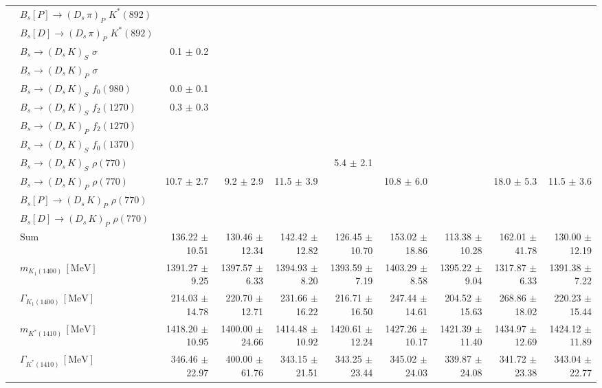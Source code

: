 \begin{tabular}{l l  r  r  r  r  r  r  r  r  }
 & $B_s[P] \to ( D_s \, \pi)_{P} \, \, K^{*}(892)$ &  &  &  &  &  &  &  &  \\ 
 & $B_s[D] \to ( D_s \, \pi)_{P} \, \, K^{*}(892)$ &  &  &  &  &  &  &  &  \\ 
 & $B_s \to ( D_s \, K)_{S} \, \, \sigma$ & 0.1 $\pm$ 0.2 &  &  &  &  &  &  &  \\ 
 & $B_s \to ( D_s \, K)_{P} \, \, \sigma$ &  &  &  &  &  &  &  &  \\ 
 & $B_s \to ( D_s \, K)_{S} \, \, f_0(980)$ & 0.0 $\pm$ 0.1 &  &  &  &  &  &  &  \\ 
 & $B_s \to ( D_s \, K)_{S} \, \, f_2(1270)$ & 0.3 $\pm$ 0.3 &  &  &  &  &  &  &  \\ 
 & $B_s \to ( D_s \, K)_{P} \, \, f_2(1270)$ &  &  &  &  &  &  &  &  \\ 
 & $B_s \to ( D_s \, K)_{S} \, \, f_0(1370)$ &  &  &  &  &  &  &  &  \\ 
 & $B_s \to ( D_s \, K)_{S} \, \, \rho(770)$ &  &  &  & 5.4 $\pm$ 2.1 &  &  &  &  \\ 
 & $B_s \to ( D_s \, K)_{P} \, \, \rho(770)$ & 10.7 $\pm$ 2.7 & 9.2 $\pm$ 2.9 & 11.5 $\pm$ 3.9 &  & 10.8 $\pm$ 6.0 &  & 18.0 $\pm$ 5.3 & 11.5 $\pm$ 3.6 \\ 
 & $B_s[P] \to ( D_s \, K)_{P} \, \, \rho(770)$ &  &  &  &  &  &  &  &  \\ 
 & $B_s[D] \to ( D_s \, K)_{P} \, \, \rho(770)$ &  &  &  &  &  &  &  &  \\ 
 & $\text{Sum}$ & 136.22 $\pm$ 10.51 & 130.46 $\pm$ 12.34 & 142.42 $\pm$ 12.82 & 126.45 $\pm$ 10.70 & 153.02 $\pm$ 18.86 & 113.38 $\pm$ 10.28 & 162.01 $\pm$ 41.78 & 130.00 $\pm$ 12.19 \\ 
\hline
 & $m_{K_1(1400)} \, [\text{MeV}]$ & 1391.27 $\pm$ 9.25 & 1397.57 $\pm$ 6.33 & 1394.93 $\pm$ 8.20 & 1393.59 $\pm$ 7.19 & 1403.29 $\pm$ 8.58 & 1395.22 $\pm$ 9.04 & 1317.87 $\pm$ 6.33 & 1391.38 $\pm$ 7.22 \\ 
 & $\Gamma_{K_1(1400)} \, [\text{MeV}]$ & 214.03 $\pm$ 14.78 & 220.70 $\pm$ 12.71 & 231.66 $\pm$ 16.22 & 216.71 $\pm$ 16.50 & 247.44 $\pm$ 14.61 & 204.52 $\pm$ 15.63 & 268.86 $\pm$ 18.02 & 220.23 $\pm$ 15.44 \\ 
 & $m_{K^{*}(1410)} \, [\text{MeV}]$ & 1418.20 $\pm$ 10.95 & 1400.00 $\pm$ 24.66 & 1414.48 $\pm$ 10.92 & 1420.61 $\pm$ 12.24 & 1427.26 $\pm$ 10.17 & 1421.39 $\pm$ 11.40 & 1434.97 $\pm$ 12.69 & 1424.12 $\pm$ 11.89 \\ 
 & $\Gamma_{K^{*}(1410)} \, [\text{MeV}]$ & 346.46 $\pm$ 22.97 & 400.00 $\pm$ 61.76 & 343.15 $\pm$ 21.51 & 343.25 $\pm$ 23.44 & 345.02 $\pm$ 24.03 & 339.87 $\pm$ 24.08 & 341.72 $\pm$ 23.38 & 343.04 $\pm$ 22.77 \\ 

\end{tabular}
